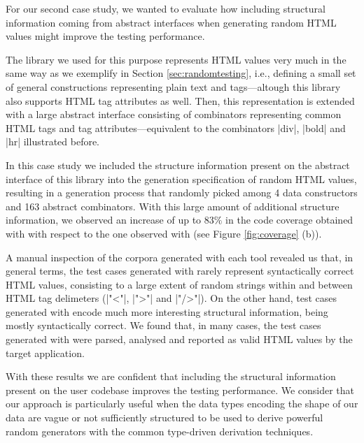 For our second case study, we wanted to evaluate how including structural
information coming from abstract interfaces when generating random HTML values
might improve the testing performance.


The library we used for this purpose represents HTML values very much in the
same way as we exemplify in Section \ref{sec:randomtesting}, i.e., defining a
small set of general constructions representing plain text and tags---altough
this library also supports HTML tag attributes as well.
%
Then, this representation is extended with a large abstract interface consisting
of combinators representing common HTML tags and tag attributes---equivalent to
the combinators |div|, |bold| and |hr| illustrated before.


In this case study we included the structure information present on the abstract
interface of this library into the generation specification of random HTML
values, resulting in a generation process that randomly picked among 4 data
constructors and 163 abstract combinators.
%
With this large amount of additional structure information, we observed an
increase of up to $83\%$ in the code coverage obtained with \dragenp with
respect to the one observed with \dragen (see Figure \ref{fig:coverage} (b)).


A manual inspection of the corpora generated with each tool revealed us that, in
general terms, the test cases generated with \dragen rarely represent
syntactically correct HTML values, consisting to a large extent of random
strings within and between HTML tag delimeters (|"<"|, |">"| and |"/>"|).
%
On the other hand, test cases generated with \dragenp encode much more
interesting structural information, being mostly syntactically correct.
%
We found that, in many cases, the test cases generated with \dragenp were
parsed, analysed and reported as valid HTML values by the target application.


With these results we are confident that including the structural information
present on the user codebase improves the testing performance.
%
We consider that our approach is particularly useful when the data types
encoding the shape of our data are vague or not sufficiently structured to be
used to derive powerful random generators with the common type-driven
derivation techniques.
